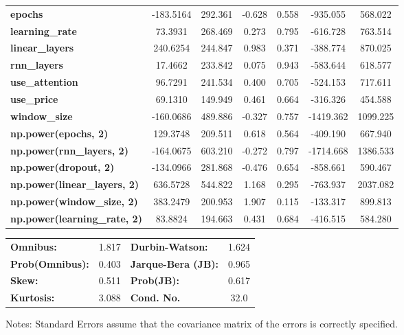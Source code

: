 \begin{center}
\begin{tabular}{lcccccc}
\textbf{epochs}                            &    -183.5164  &      292.361     &    -0.628  &         0.558        &     -935.055    &      568.022     \\
\textbf{learning\_rate}                    &      73.3931  &      268.469     &     0.273  &         0.795        &     -616.728    &      763.514     \\
\textbf{linear\_layers}                    &     240.6254  &      244.847     &     0.983  &         0.371        &     -388.774    &      870.025     \\
\textbf{rnn\_layers}                       &      17.4662  &      233.842     &     0.075  &         0.943        &     -583.644    &      618.577     \\
\textbf{use\_attention}                    &      96.7291  &      241.534     &     0.400  &         0.705        &     -524.153    &      717.611     \\
\textbf{use\_price}                        &      69.1310  &      149.949     &     0.461  &         0.664        &     -316.326    &      454.588     \\
\textbf{window\_size}                      &    -160.0686  &      489.886     &    -0.327  &         0.757        &    -1419.362    &     1099.225     \\
\textbf{np.power(epochs, 2)}               &     129.3748  &      209.511     &     0.618  &         0.564        &     -409.190    &      667.940     \\
\textbf{np.power(rnn\_layers, 2)}          &    -164.0675  &      603.210     &    -0.272  &         0.797        &    -1714.668    &     1386.533     \\
\textbf{np.power(dropout, 2)}              &    -134.0966  &      281.868     &    -0.476  &         0.654        &     -858.661    &      590.467     \\
\textbf{np.power(linear\_layers, 2)}       &     636.5728  &      544.822     &     1.168  &         0.295        &     -763.937    &     2037.082     \\
\textbf{np.power(window\_size, 2)}         &     383.2479  &      200.953     &     1.907  &         0.115        &     -133.317    &      899.813     \\
\textbf{np.power(learning\_rate, 2)}       &      83.8824  &      194.663     &     0.431  &         0.684        &     -416.515    &      584.280     \\
\bottomrule
\end{tabular}
\begin{tabular}{lclc}
\textbf{Omnibus:}       &  1.817 & \textbf{  Durbin-Watson:     } &    1.624  \\
\textbf{Prob(Omnibus):} &  0.403 & \textbf{  Jarque-Bera (JB):  } &    0.965  \\
\textbf{Skew:}          &  0.511 & \textbf{  Prob(JB):          } &    0.617  \\
\textbf{Kurtosis:}      &  3.088 & \textbf{  Cond. No.          } &     32.0  \\
\bottomrule
\end{tabular}
\end{center}

Notes: \newline
 [1] Standard Errors assume that the covariance matrix of the errors is correctly specified.